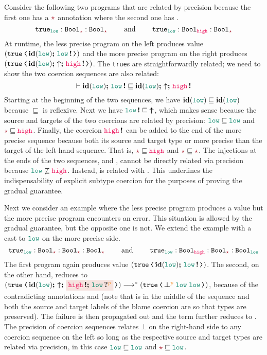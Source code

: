 \begin{example}
\label{ex:prec}
\normalfont

Consider the following two programs that are related by precision
because the first one has a $\unk$ annotation where the second one
has \high.
\[
\true_{\low} : \Bool_{\unk} : \Bool_{\unk} \qquad\text{ and }\qquad
\true_{\low} : \Bool_{\high} : \Bool_{\unk}
\]
At runtime, the less precise program on the left produces value
$(\cccast{\true}{\id{\low} \seq \inj{\low}})$ and the more precise program
on the right produces $(\cccast{\true}{\id{\low} \seq \up \seq \inj{\high}})$.
The \texttt{true}s are straightforwardly related; we need to show the two
coercion sequences are also related:
\[
\vdash \id{\low} \seq \inj{\low} \sqsubseteq \id{\low} \seq \up \seq \inj{\high}
\]
Starting at the beginning of the
two sequences, we have $\id{\low} \sqsubseteq \id{\low}$ because
$\sqsubseteq$ is reflexive. Next we have
$\inj{\low} \sqsubseteq \;\up$, which makes sense because the source
and targets of the two coercions are related by precision:
$\low \sqsubseteq \low$ and $\unk \sqsubseteq \high$.  Finally, the
coercion $\inj{\high}$ can be added to the end of the more precise
sequence because both its source and target type or more precise than
the target of the left-hand sequence.  That is,
$\unk \sqsubseteq \high$ and $\unk \sqsubseteq \unk$.
%
The injections at the ends of the two sequences, \inj{\low}
and \inj{\high}, cannot be directly related via precision because
$\low \not\sqsubseteq \high$.  Instead, \inj{\low} is related
with \up{}. This underlines the indispensability of explicit subtype
coercion \up{} for the purposes of proving the gradual guarantee.

\end{example}

\begin{example}
\label{ex:prec-error}
\normalfont

Next we consider an example where the less precise program produces a
value but the more precise program encounters an error. This situation
is allowed by the gradual guarantee, but the opposite one is not. We
extend the example with a cast to $\low$ on the more precise side.
\[
\true_{\low} : \Bool_{\unk} : \Bool_{\unk} : \Bool_{\unk}
\qquad\text{ and }\qquad
\true_{\low} : \Bool_{\high} : \Bool_{\unk} : \Bool_{\low}
\]
The first program again produces value $(\cccast{\true}{\id{\low}\seq\inj{\low}})$.
The second, on the other hand, reduces to
$(\cccast{\true}{\id{\low} \seq \up \seq \highlightred{\inj{\high} \seq \proj{\low}{p}}}) \longrightarrow^{*}
(\cccast{\true}{\err{\low}{\low}{p}})$, because of the contradicting
annotations \high and \low (note that \high is in the middle of the sequence and both the
source and target labels of the blame coercion are \low so that types are preserved).
The failure is then propagated out and the term further reduces to .
The precision of coercion sequences relates $\boldsymbol{\bot}$ on the right-hand side
to any coercion sequence on the left so long as the respective source and target types are
related via precision, in this case $\low \sqsubseteq \low$ and $\unk \sqsubseteq \low$.
\end{example}

